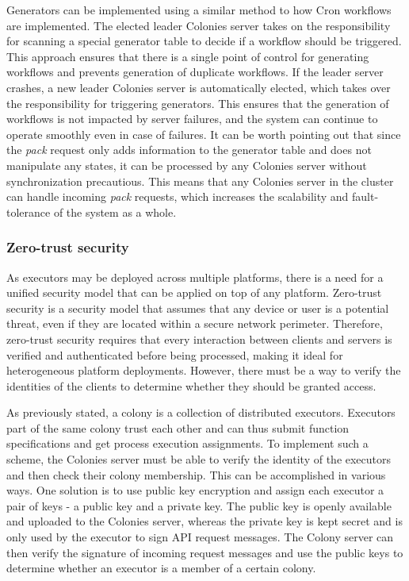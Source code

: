 \documentclass{article}
\begin{document}
Generators can be implemented using a similar method to how Cron workflows are implemented. The elected leader Colonies server takes on the responsibility for scanning a special generator table to decide if a workflow should be triggered. This approach ensures that there is a single point of control for generating workflows and prevents generation of duplicate workflows. If the leader server crashes, a new leader Colonies server is automatically elected, which takes over the responsibility for triggering generators. This ensures that the generation of workflows is not impacted by server failures, and the system can continue to operate smoothly even in case of failures. It can be worth pointing out that since the \emph{pack} request only adds information to the generator table and does not manipulate any states, it can be processed by any Colonies server without synchronization precautious. This means that any Colonies server in the cluster can handle incoming \emph{pack} requests, which increases the scalability and fault-tolerance of the system as a whole.

\subsubsection{Zero-trust security}
\label{zerotrustsecurity}
As executors may be deployed across multiple platforms, there is a need for a unified security model that can be applied on top of any platform. Zero-trust security \cite{zerotrust} is a security model that assumes that any device or user is a potential threat, even if they are located within a secure network perimeter. Therefore, zero-trust security requires that every interaction between clients and servers is verified and authenticated before being processed, making it ideal for heterogeneous platform deployments. However, there must be a way to verify the identities of the clients to determine whether they should be granted access.

As previously stated, a colony is a collection of distributed executors. Executors part of the same colony trust each other and can thus submit function specifications and get process execution assignments. To implement such a scheme, the Colonies server must be able to verify the identity of the executors and then check their colony membership. This can be accomplished in various ways. One solution is to use public key encryption and assign each executor a pair of keys - a public key and a private key. The public key is openly available and uploaded to the Colonies server, whereas the private key is kept secret and is only used by the executor to sign API request messages. The Colony server can then verify the signature of incoming request messages and use the public keys to determine whether an executor is a member of a certain colony.
\end{document}
